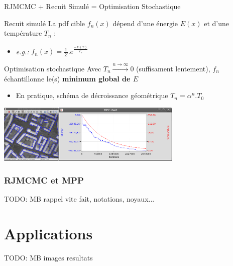\documentclass{beamer}
\begin{document}
\begin{frame}{RJMCMC + Recuit Simulé = Optimisation Stochastique}

\begin{block}{Recuit simulé}
La pdf cible $f_n(x)$ dépend d'une énergie $E(x)$ et d'une température $T_n$ :
\begin{itemize}
\item \textit{e.g.:} $f_n(x) = \frac{1}{Z}.e^\frac{-E(x)}{T_n}$
\end{itemize}
\end{block}

\begin{block}{Optimisation stochastique }
Avec $T_n\overset{n\rightarrow\infty}{\longrightarrow} 0$ (suffisament lentement), $f_n$ échantillonne le(s) \textbf{minimum global de $E$} 
\begin{itemize}
\item En pratique, schéma de décroissance géométrique $T_n=\alpha^n.T_0$
\end{itemize}
\end{block}

\includegraphics[height=2.8cm]{configuration}\hfill\includegraphics[height=2.8cm]{schedule}
\end{frame}



\begin{frame}
\frametitle{RJMCMC et MPP}
TODO: MB
rappel vite fait, notations, noyaux...
\end{frame}



\section{Applications}

\begin{frame}
TODO: MB
images resultats
\end{frame}
\end{document}

